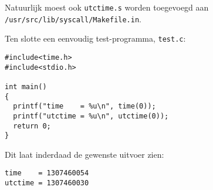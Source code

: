 \documentclass[11pt]{article}
\begin{document}
Natuurlijk moest ook \verb+utctime.s+ worden toegevoegd aan \verb+/usr/src/lib/syscall/Makefile.in+.

Ten slotte een eenvoudig test-programma, \verb+test.c+:

\begin{verbatim}
#include<time.h>
#include<stdio.h>

int main()
{
  printf("time    = %u\n", time(0));
  printf("utctime = %u\n", utctime(0));
  return 0;
}
\end{verbatim}

Dit laat inderdaad de gewenste uitvoer zien:

\begin{verbatim}
time    = 1307460054
utctime = 1307460030
\end{verbatim}
\end{document}
